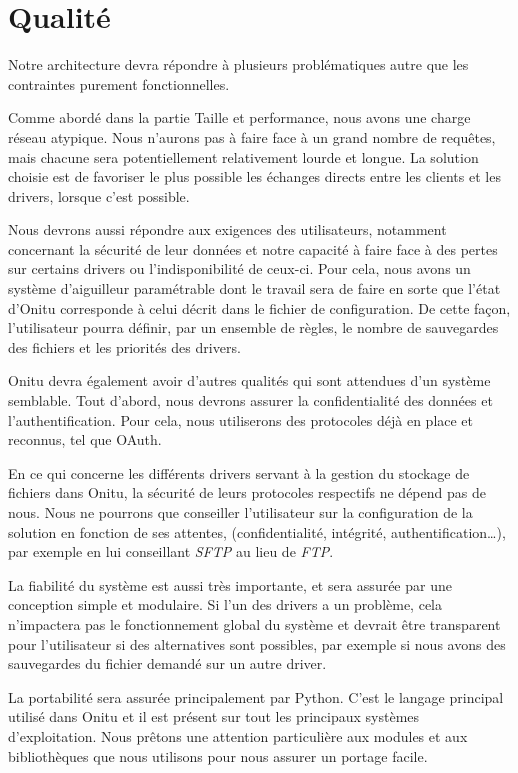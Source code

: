 \chapter{Qualité}
\thispagestyle{EIP} %

Notre architecture devra répondre à plusieurs problématiques autre que les contraintes purement fonctionnelles.

Comme abordé dans la partie Taille et performance, nous avons une charge réseau atypique. Nous n'aurons pas à faire face à un grand nombre de requêtes, mais chacune sera potentiellement relativement lourde et longue. La solution choisie est de favoriser le plus possible les échanges directs entre les clients et les drivers, lorsque c'est possible.

Nous devrons aussi répondre aux exigences des utilisateurs, notamment concernant la sécurité de leur données et notre capacité à faire face à des pertes sur certains drivers ou l'indisponibilité de ceux-ci. Pour cela, nous avons un système d'aiguilleur paramétrable dont le travail sera de faire en sorte que l'état d'Onitu corresponde à celui décrit dans le fichier de configuration. De cette façon, l'utilisateur pourra définir, par un ensemble de règles, le nombre de sauvegardes des fichiers et les priorités des drivers.

Onitu devra également avoir d'autres qualités qui sont attendues d'un système semblable. Tout d'abord, nous devrons assurer la confidentialité des données et l'authentification. Pour cela, nous utiliserons des protocoles déjà en place et reconnus, tel que OAuth.

En ce qui concerne les différents drivers servant à la gestion du stockage de fichiers dans  Onitu, la sécurité de leurs protocoles respectifs ne dépend pas de nous. Nous ne pourrons que conseiller l'utilisateur sur la configuration de la solution en fonction de ses attentes, (confidentialité, intégrité, authentification…), par exemple en lui conseillant \textit{SFTP} au lieu de \textit{FTP}.

La fiabilité du système est aussi très importante, et sera assurée par une conception simple et modulaire. Si l'un des drivers a un problème, cela n'impactera pas le fonctionnement global du système et devrait être transparent pour l'utilisateur si des alternatives sont possibles, par exemple si nous avons des sauvegardes du fichier demandé sur un autre driver.

La portabilité sera assurée principalement par Python. C'est le langage principal utilisé dans Onitu et il est présent sur tout les principaux systèmes d'exploitation. Nous prêtons une attention particulière aux modules et aux bibliothèques que nous utilisons pour nous assurer un portage facile.
